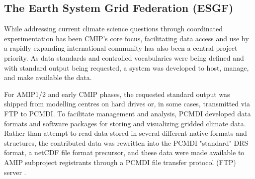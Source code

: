 \documentclass[manuscript]{copernicus}
\def\cred#1{{\color{red}#1}}
\begin{document}
\subsection{The Earth System Grid Federation (ESGF)}
\label{sec:earthSystemGridFederation}

While addressing current climate science questions through coordinated experimentation has been CMIP's core focus, facilitating data access and use by a rapidly expanding international community has also been a central project priority. As data standards and controlled vocabularies were being defined and with standard output being requested, a system was developed to host, manage, and make available the data.

For AMIP1/2 and early CMIP phases, the requested standard output was shipped from modelling centres on hard drives or, in some cases, transmitted via FTP to PCMDI. To facilitate management and analysis, PCMDI developed data formats and software packages for storing and visualizing gridded climate data. Rather than attempt to read data stored in several different native formats and structures, the contributed data was rewritten into the PCMDI "standard" DRS \citep[Data Retrieval and Storage;][]{drach_data_1995} format, a netCDF file format precursor, and these data were made available to AMIP subproject registrants through a PCMDI file transfer protocol (FTP) server \citep[see \autoref{tab:tab1-MIPsThroughTime};][]{gates_amip_1995}.
\end{document}
